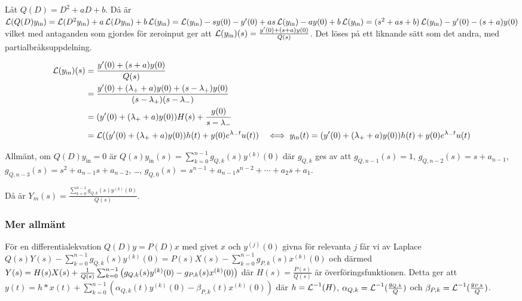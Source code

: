 \documentclass[a4paper]{article}
\begin{document}
\begin{ex}
    Låt \(
        Q(D) = D^2 + aD + b
    \). Då är \(
        \operatorname{\mathcal{L}}(Q(D) y_{\text{in}}) = \operatorname{\mathcal{L}}(D^2 y_{\text{in}}) + a \operatorname{\mathcal{L}}(D y_{\text{in}}) + b \operatorname{\mathcal{L}}(y_{\text{in}})
            = \operatorname{\mathcal{L}}(y_{\text{in}}) - s y(0) - y'(0) + as\operatorname{\mathcal{L}}(y_{\text{in}}) - a y(0) + b \operatorname{\mathcal{L}}(y_{\text{in}})
            = (s^2+as+b)\operatorname{\mathcal{L}}(y_{\text{in}}) - y'(0)-(s+a)y(0)
    \) vilket med antaganden som gjordes för zeroinput ger att \(
        \operatorname{\mathcal{L}}(y_{\text{in}})(s) = \frac{y'(0)+(s+a)y(0)}{Q(s)} 
    \). Det löses på ett liknande sätt som det andra, med 
    partialbråksuppdelning.

    \begin{align*}
        \operatorname{\mathcal{L}}(y_{\text{in}})(s) &= \frac{y'(0)+(s+a)y(0)}{Q(s)} \\
            &= \frac{y'(0) + (\lambda_+ + a) y(0) + (s-\lambda_+)y(0)}{(s-\lambda_+)(s-\lambda_-)} \\
            &= (y'(0)+(\lambda_+ + a)y(0))H(s) + \frac{y(0)}{s-\lambda_-} \\
            &= \operatorname{\mathcal{L}}( (y'(0) + (\lambda_+ + a)y(0))h(t) + y(0) e^{\lambda_- t} u(t))
            &\iff y_{\text{in}}(t) = (y'(0) + (\lambda_+ + a)y(0))h(t) + y(0) e^{\lambda_- t} u(t)
    \end{align*}
\end{ex}

Allmänt, om \(
    Q(D)y_{\text{in}} = 0
\) är \(
    Q(s) y_{\text{in}}(s) = \sum_{k=0}^{n-1} g_{Q,k}(s)y^{(k)}(0)
\) där \(
    g_{Q,k} 
\) ges av att \(
    g_{Q,n-1}(s) = 1
\), \(
    g_{Q,n-2}(s) = s + a_{n-1}
\), \(
    g_{Q,n-3}(s) = s^2 + a_{n-1} s + a_{n-2}
\), \dots, \(
    g_{Q,0}(s) = s^{n-1} + a_{n-1} s^{n-2} + \cdots + a_2 s + a_1
\).

Då är \(
    Y_m(s) = \frac{\sum_{k=0}^{n-1} g_{Q,k}(s)y^{(k)}(0)}{Q(s)} 
\). 



\subsubsection{Mer allmänt} 
För en differentialekvation \(
    Q(D) y = P(D) x
\) med givet \(
    x
\) och \(
    y^{(j)}(0)
\) givna för relevanta \(
    j
\) får vi av Laplace \(
    Q(s) Y(s) - \sum_{k=0}^{n-1} g_{Q,k}(s) y^{(k)}(0) 
        = P(s) X(s) - \sum_{k=0}^{n-1} g_{P,k}(s) x^{(k)}(0)
\) och därmed \(
    Y(s) = H(s)X(s) + \frac{1}{Q(s)} \sum_{k=0}^{n-1} \left( g_{Q,k}(s) y^{(k)}(0) - g_{P,k}(s) x^{(k)}(0) \right)
\) där \(
    H(s) = \frac{P(s)}{Q(s)} 
\) är överföringsfunktionen. Detta ger att \(
    y(t) = h*x(t) + \sum_{k=0}^{n-1} \left( \alpha_{Q,k}(t) y^{(k)}(0) - \beta_{P,k}(t) x^{(k)}(0) \right)
\) där \(
    h = \operatorname{\mathcal{L}}^{-1}(H)
\), \(
    \alpha_{Q,k} = \operatorname{\mathcal{L}}^{-1}(\frac{g_{Q,k}}{Q} )
\) och \(
    \beta_{P,k} = \operatorname{\mathcal{L}}^{-1}(\frac{g_{P,k}}{Q} )
\).
\end{document}
